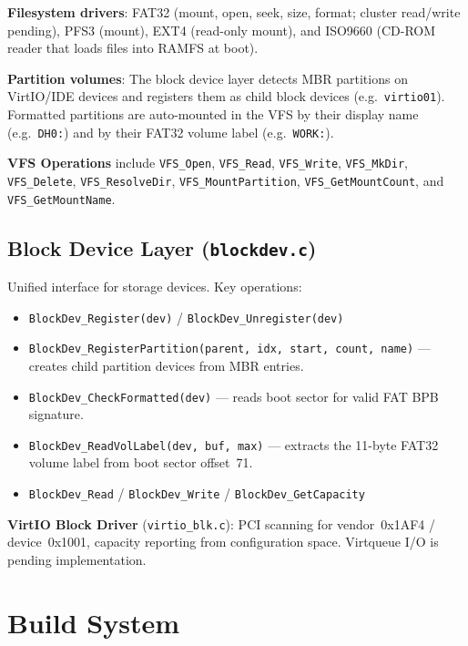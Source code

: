 \documentclass[11pt,a4paper]{report}
\begin{document}
\textbf{Filesystem drivers}: FAT32 (mount, open, seek, size, format;
cluster read/write pending), PFS3 (mount), EXT4 (read-only mount), and
ISO9660 (CD-ROM reader that loads files into RAMFS at boot).

\textbf{Partition volumes}: The block device layer detects MBR partitions
on VirtIO/IDE devices and registers them as child block devices
(e.g.\ \texttt{virtio01}).  Formatted partitions are auto-mounted in the VFS
by their display name (e.g.\ \texttt{DH0:}) and by their FAT32 volume label
(e.g.\ \texttt{WORK:}).

\textbf{VFS Operations} include \texttt{VFS\_Open}, \texttt{VFS\_Read},
\texttt{VFS\_Write}, \texttt{VFS\_MkDir}, \texttt{VFS\_Delete},
\texttt{VFS\_ResolveDir}, \texttt{VFS\_MountPartition},
\texttt{VFS\_GetMountCount}, and \texttt{VFS\_GetMountName}.

\section{Block Device Layer (\texttt{blockdev.c})}

Unified interface for storage devices.  Key operations:

\begin{itemize}
    \item \texttt{BlockDev\_Register(dev)} / \texttt{BlockDev\_Unregister(dev)}
    \item \texttt{BlockDev\_RegisterPartition(parent, idx, start, count, name)}
          --- creates child partition devices from MBR entries.
    \item \texttt{BlockDev\_CheckFormatted(dev)} --- reads boot sector for
          valid FAT BPB signature.
    \item \texttt{BlockDev\_ReadVolLabel(dev, buf, max)} --- extracts the
          11-byte FAT32 volume label from boot sector offset~71.
    \item \texttt{BlockDev\_Read} / \texttt{BlockDev\_Write} / \texttt{BlockDev\_GetCapacity}
\end{itemize}

\textbf{VirtIO Block Driver} (\texttt{virtio\_blk.c}): PCI scanning for
vendor~0x1AF4 / device~0x1001, capacity reporting from configuration space.
Virtqueue I/O is pending implementation.

\chapter{Build System}
\end{document}

